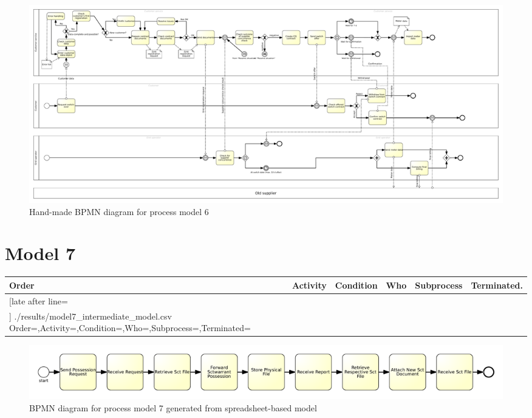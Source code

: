 \begin{figure}[H]
	\centering
	\includegraphics[width=0.95\textheight, angle=90]{./bpmn/model6.pdf}
	\caption{Hand-made BPMN diagram for process model 6}
	\label{bpmn:model6}
\end{figure}

\section{Model 7}
\begin{tcolorbox}[
	breakable,
	arc=0mm,
	left=1pt,
	right = 1pt,
	boxrule=0mm,
	colback = {white},
	]
	\texttt{}
\end{tcolorbox}
\label{txt:model7}

{\scriptsize
	\begin{longtable}{|p{0.03 \hsize}|p{0.25 \hsize}|p{0.15 \hsize}|p{0.2 \hsize}|p{0.1 \hsize}|p{0.1 \hsize}|}
		\hline
		Order & Activity & Condition & Who & Subprocess & Terminated.
		\\\hline\hline
		\csvreader[late after line=\\\hline]
		{./results/model7_intermediate_model.csv}
		{Order=\Order,Activity=\Activity,Condition=\Condition,Who=\Who,Subprocess=\Subprocess,Terminated=\Terminated}
		{\Order & \Activity & \Condition & \Who & \Subprocess & \Terminated}
		\caption{Spreadsheet-based description for process model 7}
		\label{csv:model7}
	\end{longtable}
}

\begin{figure}[H]
	\centering
	\includegraphics[width=\hsize]{./generated_bpmn/model7.pdf}
	\caption{BPMN diagram for process model 7 generated from spreadsheet-based model}
	\label{bpmn:generated_model7}
\end{figure}


